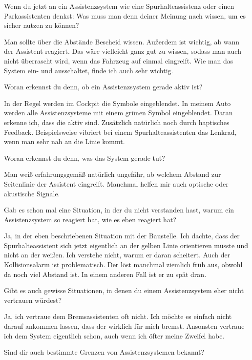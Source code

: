\interviewerin
Wenn du jetzt an ein Assistenzsystem wie eine Spurhalteassistenz oder
einen Parkassistenten denkst: Was muss man denn deiner Meinung nach
wissen, um es sicher nutzen zu können?

Man sollte über die Abstände Bescheid wissen. Außerdem ist wichtig, ab
wann der Assistent reagiert. Das wäre vielleicht ganz gut zu wissen,
sodass man auch nicht überrascht wird, wenn das Fahrzeug auf einmal
eingreift. Wie man das System ein- und ausschaltet, finde ich auch sehr
wichtig.

\interviewerin
Woran erkennst du denn, ob ein Assistenzsystem gerade aktiv ist?

In der Regel werden im Cockpit die Symbole eingeblendet. In meinem Auto
werden alle Assistenzsysteme mit einem grünen Symbol eingeblendet. Daran
erkenne ich, dass die aktiv sind. Zusätzlich natürlich noch durch
haptisches Feedback. Beispielsweise vibriert bei einem
Spurhalteassistenten das Lenkrad, wenn man sehr nah an die Linie kommt.

\interviewerin
Woran erkennst du denn, was das System gerade tut?

Man weiß erfahrungsgemäß natürlich ungefähr, ab welchem Abstand zur
Seitenlinie der Assistent eingreift. Manchmal helfen mir auch optische
oder akustische Signale.

\interviewerin
Gab es schon mal eine Situation, in der du nicht verstanden hast, warum
ein Assistenzsystem so reagiert hat, wie es eben reagiert hat?

Ja, in der eben beschriebenen Situation mit der Baustelle. Ich dachte,
dass der Spurhalteassistent sich jetzt eigentlich an der gelben Linie
orientieren müsste und nicht an der weißen. Ich verstehe nicht, warum er
daran scheitert. Auch der Kollisionsalarm ist problematisch. Der löst
manchmal ziemlich früh aus, obwohl da noch viel Abstand ist. In einem
anderen Fall ist er zu spät dran.

\interviewerin
Gibt es auch gewisse Situationen, in denen du einem Assistenzsystem eher
nicht vertrauen würdest?

Ja, ich vertraue dem Bremsassistenten oft nicht. Ich möchte es einfach
nicht darauf ankommen lassen, dass der wirklich für mich bremst.
Ansonsten vertraue ich dem System eigentlich schon, auch wenn ich öfter
meine Zweifel habe.

\interviewerin
Sind dir auch bestimmte Grenzen von Assistenzsystemen bekannt?

